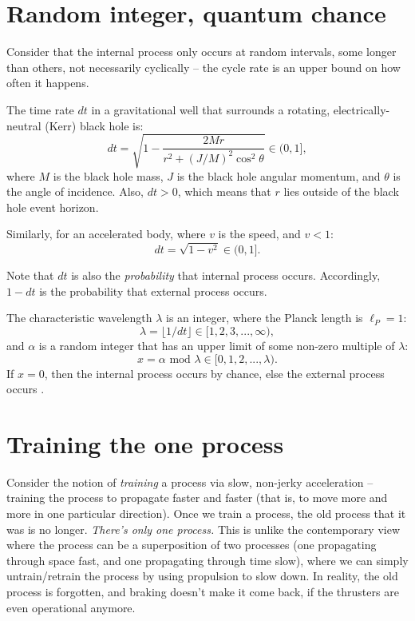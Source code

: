 \documentclass[12pt]{article}
\begin{document}
\section{Random integer, quantum chance}
Consider that the internal process only occurs at random intervals, some longer than others, not necessarily cyclically -- the cycle rate is an upper bound on how often it happens.

The time rate $dt$ in a gravitational well that surrounds a rotating, electrically-neutral (Kerr) black hole \cite{mtw} is:
\begin{equation}
dt = \sqrt{1 - \frac{2Mr}{r^2 + (J/M)^2 \cos^2 \theta}} \in (0, 1] ,
\end{equation}
where $M$ is the black hole mass, $J$ is the black hole angular momentum, and $\theta$ is the angle of incidence.
Also, $dt > 0$, which means that $r$ lies outside of the black hole event horizon.

Similarly, for an accelerated body, where $v$ is the speed, and $v < 1$:
\begin{equation}
dt = \sqrt{1 - {v^2}}  \in (0, 1].
\end{equation}

Note that $dt$ is also the \textit{probability} that internal process occurs.
Accordingly, $1 - dt$ is the probability that external process occurs.

The characteristic wavelength $\lambda$ is an integer, where the Planck length is $\ell_P = 1$:
\begin{equation}
\lambda = \lfloor{1}/{dt} \rfloor \in  [1, 2, 3, ..., \infty) ,
\end{equation}
and $\alpha$ is a random integer that has an upper limit of some non-zero multiple of $\lambda$:
\begin{equation}
x = \alpha \textrm{ mod } \lambda \in [0, 1, 2, ..., \lambda).
\end{equation}
If $x = 0$, then the internal process occurs by chance, else the external process occurs \cite{dilbert}.




\section{Training the one process}
Consider the notion of \textit{training} a process via slow, non-jerky acceleration -- training the process to propagate faster and faster (that is, to move more and more in one particular direction).
Once we train a process, the old process that it was is no longer.
\textit{There's only one process.}
This is unlike the contemporary view where the process can be a superposition of two processes (one propagating through space fast, and one propagating through time slow), where we can simply untrain/retrain the process by using propulsion to slow down.
In reality, the old process is forgotten, and braking doesn't make it come back, if the thrusters are even operational anymore.
\end{document}
